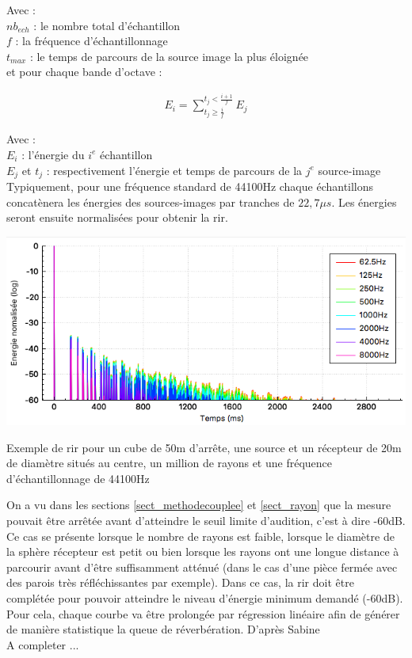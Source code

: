 Avec : \\
$nb_{ech}$ : le nombre total d'échantillon \\
$f$ : la fréquence d'échantillonnage \\
$t_{max}$ : le temps de parcours de la source image la plus éloignée \\

et pour chaque bande d'octave : 

\begin{align}
E_{i} =  \sum_{ t_j \geqslant \frac{i}{f}}^{ t_j  < \frac{i+1}{f}}{E_j}
\end{align}

Avec : \\
$E_{i}$ : l'énergie du $i^e$ échantillon \\
$E_j$ et $t_j$ : respectivement l'énergie et temps de parcours de la $j^e$ source-image \\


Typiquement, pour une fréquence standard de 44100Hz chaque échantillons concatènera les énergies des sources-images par tranches de $22,7\mu s$. Les énergies seront ensuite normalisées pour obtenir la \gls{rir}.
 
 \begin{figureth}
	\includegraphics[width=0.9\linewidth]{images/rir}
	\caption{Exemple de \gls{rir} pour un cube de 50m d'arrête, une source et un récepteur de 20m de diamètre situés au centre, un million de rayons et une fréquence d'échantillonnage de 44100Hz}
\end{figureth}

On a vu dans les sections \ref{sect_methodecouplee} et \ref{sect_rayon} que la mesure pouvait être arrêtée avant d'atteindre le seuil limite d'audition, c'est à dire -60dB. Ce cas se présente lorsque le nombre de rayons est faible, lorsque le diamètre de la sphère récepteur est petit ou bien lorsque les rayons ont une longue distance à parcourir avant d'être suffisamment atténué (dans le cas d'une pièce fermée avec des parois très réfléchissantes par exemple). Dans ce cas, la \gls{rir} doit être complétée pour pouvoir atteindre le niveau d'énergie minimum demandé (-60dB). Pour cela, chaque courbe va être prolongée par régression linéaire afin de générer de manière statistique la queue de réverbération. D'après Sabine \cite[]{sabine} \\
A completer ...










